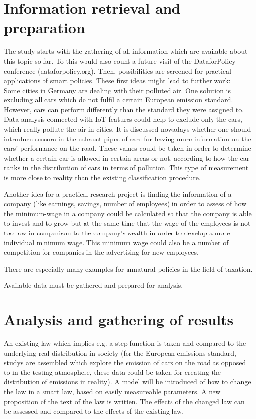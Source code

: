 \documentclass[12pt,a4paper]{article}
\begin{document}
	\section{Information retrieval and preparation}
	
	The study starts with the gathering of all information which are available about this topic so far. To this would also count a future visit of the DataforPolicy-conference (dataforpolicy.org). Then, possibilities are screened for practical applications of smart policies. These first ideas might lead to further work: \\
	Some cities in Germany are dealing with their polluted air. One solution is excluding all cars which do not fulfil a certain European emission standard. However, cars can perform differently than the standard they were assigned to. Data analysis connected with IoT features could help to exclude only the cars, which really pollute the air in cities. It is discussed nowadays whether one should introduce sensors in the exhaust pipes of cars for having more information on the cars' performance on the road. These values could be taken in order to determine whether a certain car is allowed in certain areas or not, according to how the car ranks in the distribution of cars in terms of pollution. This type of measurement is more close to reality than the existing classification procedure.
	 
	Another idea for a practical research project is finding the information of a company (like earnings, savings, number of employees) in order to assess of how the minimum-wage in a company could be calculated so that the company is able to invest and to grow but at the same time that the wage of the employees is not too low in comparison to the company's wealth in order to develop a more individual minimum wage. This minimum wage could also be a number of competition for companies in the advertising for new employees.
	
	There are especially many examples for unnatural policies in the field of taxation.
	
	Available data must be gathered and prepared for analysis.
	
	\section{Analysis and gathering of results}
	
	An existing law which implies e.g. a step-function is taken and compared to the underlying real distribution in society (for the European emissions standard, studys are assembled which explore the emission of cars on the road as opposed to in the testing atmosphere, these data could be taken for creating the distribution of emissions in reality). A model will be introduced of how to change the law in a smart law, based on easily measureable parameters. A new proposition of the text of the law is written. The effects of the changed law can be assessed and compared to the effects of the existing law.
	
\end{document}
